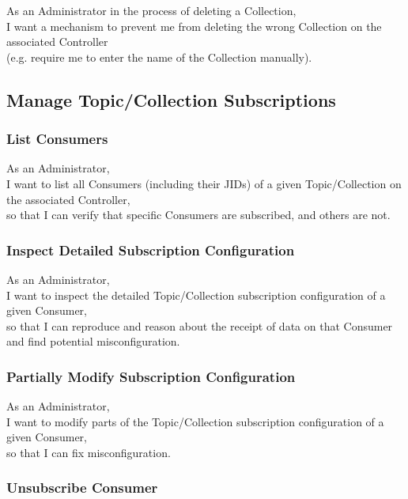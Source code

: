 As an Administrator in the process of deleting a Collection, \\
I want a mechanism to prevent me from deleting the wrong Collection on the associated Controller\\
(e.g. require me to enter the name of the Collection manually).


\subsection{Manage Topic/Collection Subscriptions}\label{sec:manage-subscriptions}

\subsubsection{List Consumers}

As an Administrator, \\
I want to list all Consumers (including their JIDs) of a given Topic/Collection on the associated Controller, \\
so that I can verify that specific Consumers are subscribed, and others are not.


\subsubsection{Inspect Detailed Subscription Configuration}

As an Administrator, \\
I want to inspect the detailed Topic/Collection subscription configuration of a given Consumer, \\
so that I can reproduce and reason about the receipt of data on that Consumer
and find potential misconfiguration.

\subsubsection{Partially Modify Subscription Configuration}

As an Administrator, \\
I want to modify parts of the Topic/Collection subscription configuration of a given Consumer, \\
so that I can fix misconfiguration.

\subsubsection{Unsubscribe Consumer}

